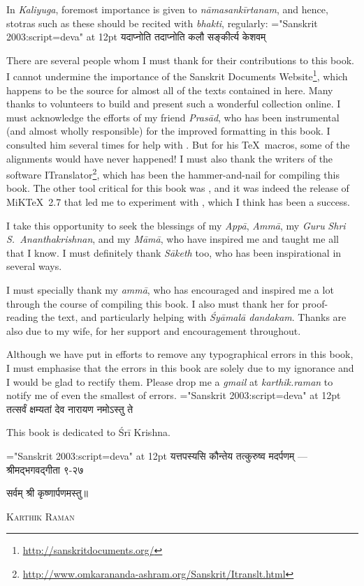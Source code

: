 \noindent In \textit{Kaliyuga}, foremost importance is given to \textit{nāmasankīrtanam}, and hence, stotras such as these should be recited with \textit{bhakti}, regularly:
{\font \x="Sanskrit 2003:script=deva" at 12pt\x
{}
{यदाप्नोति तदाप्नोति कलौ सङ्कीर्त्य केशवम्}
}

There are several people whom I must thank for their contributions to this book. I cannot undermine the importance of the Sanskrit Documents Website\footnote{\scriptsize \url{http://sanskritdocuments.org/}}, which happens to be the source for almost all of the texts contained in here. Many thanks to volunteers to build and present such a wonderful collection online.
\thispagestyle{fancy}
I must acknowledge the efforts of my friend \textit{Prasād}, who has been instrumental (and almost wholly responsible) for the improved formatting in this book. I consulted him several times for help with \XeLaTeX. But for his \TeX\ macros, some of the alignments would have never happened! I must also thank the writers of the software ITranslator\footnote{\scriptsize \url{http://www.omkarananda-ashram.org/Sanskrit/Itranslt.html}}, which has been the hammer-and-nail for compiling this book. The other tool critical for this book was \XeLaTeX, and it was indeed the release of MiK\TeX\ 2.7 that led me to experiment with \XeLaTeX, which I think has been a success.

I take this opportunity to seek the blessings of my \textit{Appā}, \textit{Ammā}, my \textit{Guru} \textit{Shri S.~Ananthakrishnan}, and my \textit{Māmā}, who have inspired me and taught me all that I know. I must definitely thank \textit{Sāketh} too, who has been inspirational in several ways.

I must specially thank my \textit{ammā}, who has encouraged and inspired me a lot through the course of compiling this book. I also must thank her for proof-reading the text, and particularly helping with \textit{Śyāmalā dandakam}. Thanks are also due to my wife, for her support and encouragement throughout.

Although we have put in efforts to remove any typographical errors in this book, I must emphasise that the errors in this book are solely due to my ignorance and I would be glad to rectify them. Please drop me a \textit{gmail} at \textit{karthik.raman} to notify me of even the smallest of errors.
\thispagestyle{fancy}
{\font \x="Sanskrit 2003:script=deva" at 12pt\x
{}
{तत्सर्वं क्षम्यतां देव नारायण नमोऽस्तु ते}
}

This book is dedicated to Śrī Krishna.
{\font \x="Sanskrit 2003:script=deva" at 12pt\x
{}
{यत्तपस्यसि कौन्तेय तत्कुरुष्व मदर्पणम्}
\hfill — श्रीमद्भगवद्गीता ९-२७
\centerline{सर्वम् श्री कृष्णार्पणमस्तु॥}
}

\medskip
{} \hfill \textsc{Karthik Raman}
